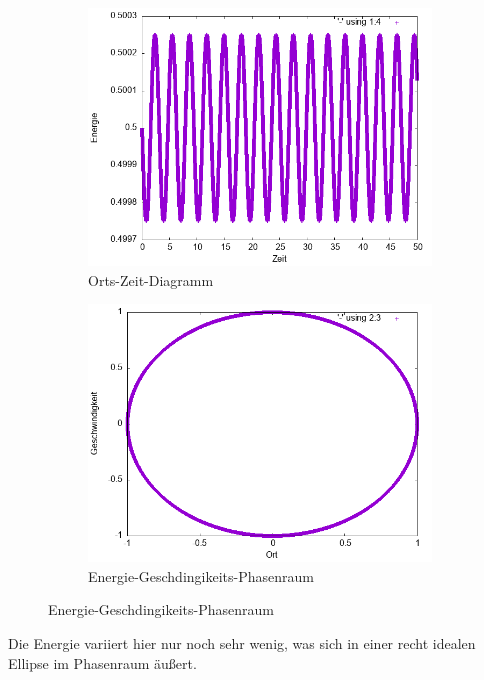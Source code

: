 \documentclass[
    oneside,
    ngerman,
    footinclude=false,
    captions=tableheading,
    DIV=12
]{scrartcl}
\begin{document}
        \begin{figure}[H]
        \centering
        \begin{subfigure}[b]{0.45\textwidth}
            \centering
            \includegraphics[width=\textwidth]{Bilddateien/expEulerA1(a)-0001-E.png}
            \caption{Orts-Zeit-Diagramm}
            \label{fig:expEulerA1(a)-0001-0-E}
        \end{subfigure}
        \hfill
        \begin{subfigure}[b]{0.45\textwidth}
            \centering
            \includegraphics[width=\textwidth]{Bilddateien/expEulerA1(a)-0001-0-xv.png}
            \caption{Energie-Geschdingikeits-Phasenraum}
            \label{fig:expEulerA1(a)-0001-0-xv}
        \end{subfigure}
    \end{figure}
    Die Energie variiert hier nur noch sehr wenig, was sich in einer recht idealen Ellipse im Phasenraum äußert.
\end{document}
